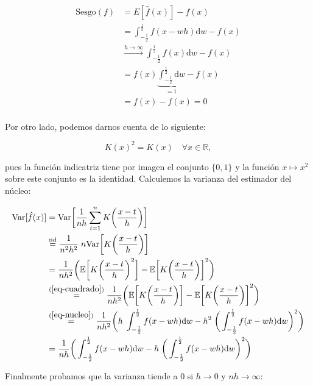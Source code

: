\documentclass[a4paper]{article}
\newcommand{\R}{\mathbb{R}}
\newcommand{\E}{\mathbb{E}}
\newcommand{\Var}{\text{Var}}
\begin{document}
\begin{align*}
	\text{Sesgo}(f) & = E [ \hat f(x) ] - f(x) \\
	& = \int_{-\frac{1}{2}}^{\frac{1}{2}} f(x - wh) \text{d}w - f(x) \\
	& \stackrel{h \rightarrow \infty}{\longrightarrow} \int_{-\frac{1}{2}}^{\frac{1}{2}} f(x) \text{d}w - f(x) \\
	& =  f(x) \underbrace{\int_{-\frac{1}{2}}^{\frac{1}{2}} \text{d}w}_{= 1} - f(x) \\
	& =  f(x) - f(x) = 0 \\
\end{align*}

Por otro lado, podemos darnos cuenta de lo siguiente:

\begin{equation}
	\label{eq-cuadrado}
	K(x)^2 = K(x) \quad \forall x \in \R,
\end{equation}

pues la función indicatriz tiene por imagen el conjunto $\{0,1\}$ y la función $x \mapsto x^2$ sobre este conjunto es la identidad. Calculemos la varianza del estimador del núcleo:

\begin{align*}
	\Var [ \hat f(x)] & = \Var \bigg[ \frac{1}{nh} \sum_{i=1}^n K\bigg(\frac{x - t}{h}\bigg) \bigg] \\
	& \stackrel{\text{iid}}{=} \frac{1}{n^2 h^2} \; n \Var \bigg[ K\bigg(\frac{x - t}{h}\bigg) \bigg] \\
	& = \frac{1}{n h^2} \bigg( \E \bigg[ K\bigg(\frac{x - t}{h}\bigg)^2 \bigg] - \E \bigg[ K\bigg(\frac{x - t}{h}\bigg) \bigg]^2 \bigg)  \\
	& \stackrel{(\ref{eq-cuadrado})}{=} \frac{1}{n h^2} \bigg( \E \bigg[ K\bigg(\frac{x - t}{h}\bigg) \bigg] - \E \bigg[ K\bigg(\frac{x - t}{h}\bigg) \bigg]^2 \bigg)  \\
	& \stackrel{(\ref{eq-nucleo})}{=} \frac{1}{n h^2} \bigg( h \; \int_{-\frac{1}{2}}^{\frac{1}{2}} f(x - wh) \text{d}w - h^2 \; \bigg( \int_{-\frac{1}{2}}^{\frac{1}{2}} f(x - wh) \text{d}w\bigg) ^2 \bigg) \\
	& = \frac{1}{n h} \bigg( \int_{-\frac{1}{2}}^{\frac{1}{2}} f(x - wh) \text{d}w - h \; \bigg( \int_{-\frac{1}{2}}^{\frac{1}{2}} f(x - wh) \text{d}w\bigg) ^2 \bigg) \\
\end{align*}

Finalmente probamos que la varianza tiende a $0$ si $h \rightarrow 0$ y $nh \rightarrow \infty$:
\end{document}
